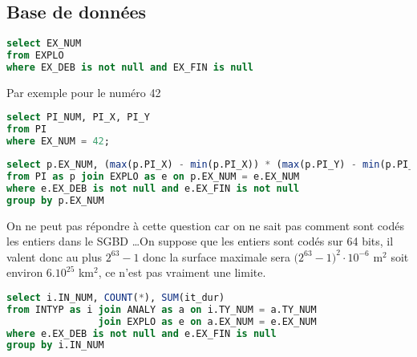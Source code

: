 \subsection{Base de données}
\begin{Exercise}[title = {\bf I.C.1)}]
\begin{lstlisting}[language=sql]
select EX_NUM 
from EXPLO 
where EX_DEB is not null and EX_FIN is null
\end{lstlisting}
\end{Exercise}
\begin{Exercise}[title = {\bf I.C.2)}]
Par exemple pour le numéro 42
\begin{lstlisting}[language=sql]
select PI_NUM, PI_X, PI_Y
from PI 
where EX_NUM = 42;
\end{lstlisting}
\end{Exercise}
\begin{Exercise}[title = {\bf I.C.3)}]
\begin{lstlisting}[language=sql]
select p.EX_NUM, (max(p.PI_X) - min(p.PI_X)) * (max(p.PI_Y) - min(p.PI_Y))/1000000.0
from PI as p join EXPLO as e on p.EX_NUM = e.EX_NUM
where e.EX_DEB is not null and e.EX_FIN is not null
group by p.EX_NUM
\end{lstlisting}
\end{Exercise}
\begin{Exercise}[title = {\bf I.C.4)}]
On ne peut pas répondre à cette question car on ne sait pas comment sont codés les entiers dans le SGBD \dots On suppose que les entiers sont codés sur 64 bits, il valent donc au plus $2^{63} - 1$ donc la surface maximale sera $\bigl(2^{63}-1\bigr)^2\cdot10^{-6}$ m$^2$ soit environ $6.10^{25}$ km$^2$, ce n'est pas vraiment une limite.
\end{Exercise}
\begin{Exercise}[title = {\bf I.C.5)}]
\begin{lstlisting}[language=sql]
select i.IN_NUM, COUNT(*), SUM(it_dur)
from INTYP as i join ANALY as a on i.TY_NUM = a.TY_NUM
                join EXPLO as e on a.EX_NUM = e.EX_NUM 
where e.EX_DEB is not null and e.EX_FIN is null
group by i.IN_NUM
\end{lstlisting}
\end{Exercise}
